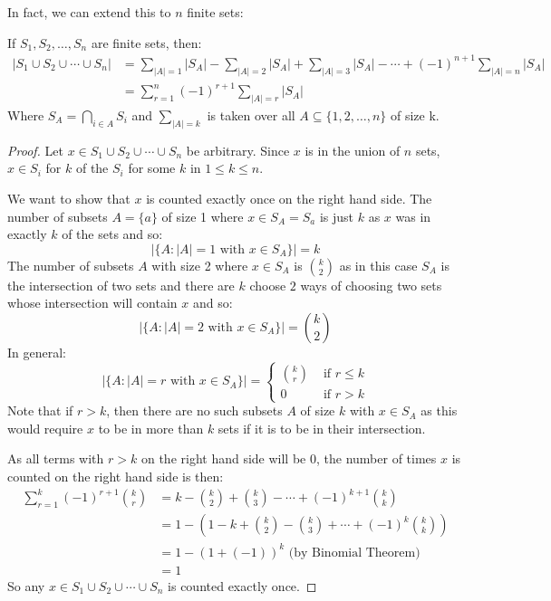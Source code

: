 \documentclass[../main.tex]{subfiles}
\begin{document}
In fact, we can extend this to $n$ finite sets:
\begin{theorem}
   If $S_1, S_2, \ldots, S_n$ are finite sets, then:
   \begin{align*}
     |S_1 \cup S_2 \cup \cdots \cup S_n| &= \sum_{|A| = 1} |S_A| - \sum_{|A| = 2} |S_A| + \sum_{|A| =  3} |S_A| - \cdots + (-1)^{n + 1} \sum_{|A| = n} |S_A| \\
                                         &= \sum_{r = 1}^{n} (-1)^{r + 1} \sum_{|A| = r} |S_A|
   \end{align*}
   Where $S_A = \bigcap_{i \in A} S_i$ and $\sum_{|A| = k}$ is taken over all $A \subseteq \{1, 2, \ldots, n\}$ of size k.
\end{theorem}
\begin{proof}
  Let $x \in S_1 \cup S_2 \cup \cdots \cup S_n$ be arbitrary.
  Since $x$ is in the union of $n$ sets, $x \in S_i$ for $k$ of the $S_i$ for some $k$ in $1 \leq k \leq n$.

  We want to show that $x$ is counted exactly once on the right hand side.
  The number of subsets $A = \{a\}$ of size 1 where $x \in S_A = S_a$ is just $k$ as $x$ was in exactly $k$ of the sets and so:
  \[
    |\{A: |A| = 1 \text{ with } x \in S_A\}| = k
  \]
  The number of subsets $A$ with size 2 where $x \in S_A$ is $\binom{k}{2}$ as in this case $S_A$ is the intersection of two sets and there are $k$ choose $2$ ways of choosing two sets whose intersection will contain $x$ and so:
  \[
    |\{A: |A| = 2 \text{ with } x \in S_A\}| = \binom{k}{2}
  \]
  In general:
  \[
    |\{A: |A| = r \text{ with } x \in S_A\}| =
    \begin{cases}
    \binom{k}{r} & \text{ if } r\leq k \\
    0 & \text{ if } r > k
    \end{cases}
  \]
  Note that if $r > k$, then there are no such subsets $A$ of size $k$ with $x \in S_A$ as this would require $x$ to be in more than $k$ sets if it is to be in their intersection.

  As all terms with $r > k$ on the right hand side will be 0, the number of times $x$ is counted on the right hand side is then:
  \begin{align*}
    \sum_{r=1}^{k} (-1)^{r + 1} \binom{k}{r} &= k - \binom{k}{2} + \binom{k}{3} - \cdots + (-1)^{k + 1} \binom{k}{k} \\
    &= 1 - \left(1 - k + \binom{k}{2} - \binom{k}{3} + \cdots + (-1)^{k}\binom{k}{k}\right) \\
    &= 1 - (1 + (-1))^{k} \text{ (by Binomial Theorem)}\\
    &= 1
  \end{align*}
  So any $x \in S_1 \cup S_2 \cup \cdots \cup S_n$ is counted exactly once.
\end{proof}
\end{document}
